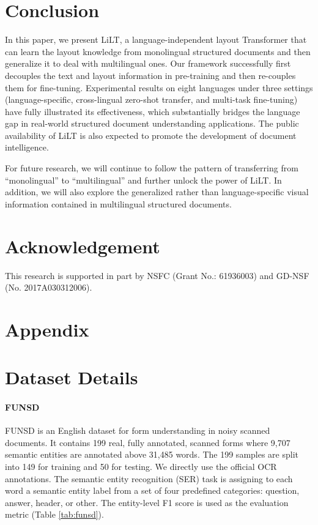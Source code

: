 \documentclass[11pt]{article}
\begin{document}
\section{Conclusion}
In this paper, we present LiLT, a language-independent layout Transformer that can learn the layout knowledge from  monolingual structured documents and then generalize  it  to deal with multilingual ones.
Our framework successfully first decouples the text and layout information in pre-training and then re-couples them for fine-tuning.
Experimental results on eight languages under three settings (language-specific, cross-lingual zero-shot transfer, and multi-task fine-tuning) have fully illustrated 
its effectiveness,
which substantially  bridges the language gap in real-world structured document understanding  applications. 
The public availability of LiLT is also expected to promote the development of document intelligence.

For future research, we will continue to follow the pattern of transferring from ``monolingual” to ``multilingual” and 
further unlock the power of LiLT. 
In addition, we will also explore the generalized rather than language-specific visual information contained in multilingual structured documents.
\section{Acknowledgement}
This research is supported in part by NSFC (Grant No.: 61936003) and GD-NSF (No.  2017A030312006).




\clearpage
\appendix
\setcounter{secnumdepth}{0}
\section{Appendix}
\setcounter{secnumdepth}{1}
\section{Dataset Details}\label{app1}

\paragraph{FUNSD} FUNSD \cite{funsd} is an English dataset for form understanding in noisy scanned documents. It contains 199 real, fully annotated, scanned forms where 9,707 semantic entities are annotated above 31,485 words. The 199 samples are split into 149 for training and 50 for testing.
We directly use the official OCR annotations.
The semantic entity recognition (SER) task is assigning to each word a semantic entity label from a set of four predefined categories: question, answer, header, or other. The entity-level F1 score is used as the evaluation metric (Table \ref{tab:funsd}).
\end{document}
